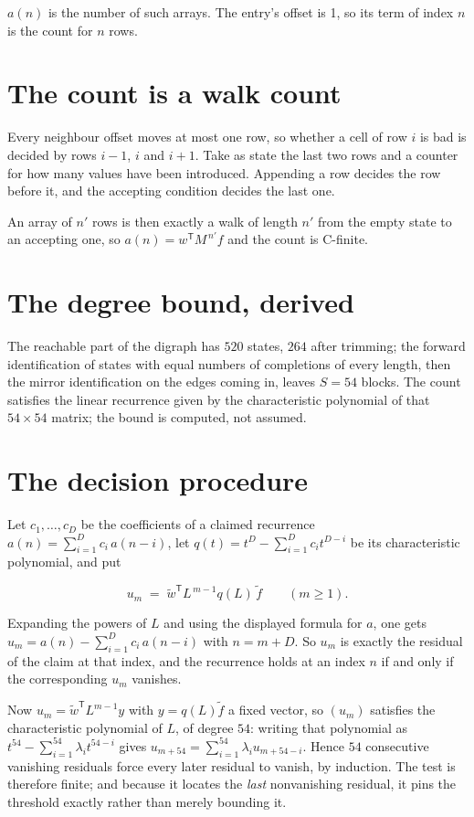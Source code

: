 \documentclass[11pt]{article}
\theoremstyle{definition}
\begin{document}
$a(n)$ is the number of such arrays. The entry's offset is 1, so its term of index $n$ is the count for $n$ rows.

\section{The count is a walk count}

Every neighbour offset moves at most one row, so whether a cell of row $i$ is bad is decided by rows $i-1$, $i$ and $i+1$. Take as state the last two rows and a counter for how many values have been introduced. Appending a row decides the row before it, and the accepting condition decides the last one.

An array of $n'$ rows is then exactly a walk of length $n'$ from the empty state to an accepting one, so $a(n) = w^{\mathsf T}M^{\,n'}f$ and the count is C-finite.

\section{The degree bound, derived}

The reachable part of the digraph has $520$ states, $264$ after trimming; the forward identification of states with equal numbers of completions of every length, then the mirror identification on the edges coming in, leaves $S = 54$ blocks. The count satisfies the linear recurrence given by the characteristic polynomial of that $54\times54$ matrix; the bound is computed, not assumed.

\section{The decision procedure}

Let $c_1,\dots,c_D$ be the coefficients of a claimed recurrence $a(n) = \sum_{i=1}^{D} c_i\,a(n-i)$, let $q(t) = t^{D} - \sum_{i=1}^{D} c_i t^{D-i}$ be its characteristic polynomial, and put

\[u_m \;=\; \tilde w^{\mathsf T} L^{\,m-1} q(L)\,\tilde f \qquad (m \ge 1).\]

Expanding the powers of $L$ and using the displayed formula for $a$, one gets $u_m = a(n) - \sum_{i=1}^{D} c_i\,a(n-i)$ with $n = m + D$. So $u_m$ is exactly the residual of the claim at that index, and the recurrence holds at an index $n$ if and only if the corresponding $u_m$ vanishes.

Now $u_m = \tilde w^{\mathsf T} L^{m-1} y$ with $y = q(L)\tilde f$ a fixed vector, so $(u_m)$ satisfies the characteristic polynomial of $L$, of degree $54$: writing that polynomial as $t^{54} - \sum_{i=1}^{54} \lambda_i t^{54-i}$ gives $u_{m+54} = \sum_{i=1}^{54} \lambda_i u_{m+54-i}$. Hence $54$ consecutive vanishing residuals force every later residual to vanish, by induction. The test is therefore finite; and because it locates the {\itshape last} nonvanishing residual, it pins the threshold exactly rather than merely bounding it.
\end{document}
